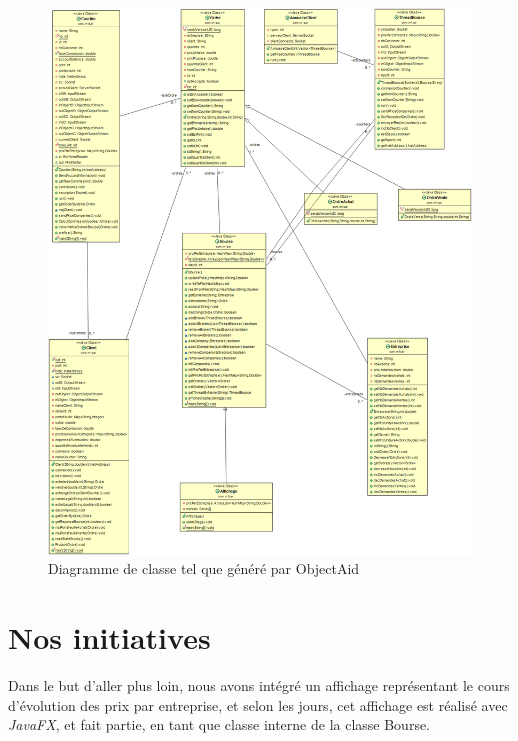 \documentclass[11pt]{article}
\begin{document}
\begin{figure}[!htb]
  \centering
    \caption{Diagramme de classe tel que généré par ObjectAid}
    \includegraphics[width=\textwidth]{ClassDiagram.png}
\newline \newline
\end{figure}


\section{Nos initiatives}

Dans le but d'aller plus loin, nous avons intégré un affichage représentant le cours d'évolution des prix par entreprise, et selon les jours, cet affichage est réalisé avec \textit{JavaFX}, et fait partie, en tant que classe interne de la classe Bourse. \newline
\end{document}
